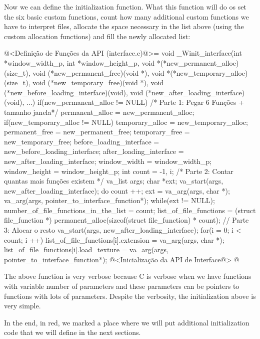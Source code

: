 Now we can define the initialization function. What this function will
do os set the six basic custom functions, count how many additional
custom functions we have to interpret files, allocate the space
necessary in the list above (using the custom allocation functions)
and fill the newly allocated list:

\iniciocodigo
@<Definição de Funções da API (interface.c)@>=
void _Winit_interface(int *window_width_p, int *window_height_p,
                      void *(*new_permanent_alloc)(size_t),
                      void (*new_permanent_free)(void *),
                      void *(*new_temporary_alloc)(size_t),
                      void (*new_temporary_free)(void *),
                      void (*new_before_loading_interface)(void),
                      void (*new_after_loading_interface)(void), ...){
  if(new_permanent_alloc != NULL) /* Parte 1: Pegar 6 Funções + tamanho janela*/
    permanent_alloc = new_permanent_alloc;
  if(new_temporary_alloc != NULL)
    temporary_alloc = new_temporary_alloc;
  permanent_free = new_permanent_free;
  temporary_free = new_temporary_free;
  before_loading_interface = new_before_loading_interface;
  after_loading_interface = new_after_loading_interface;
  window_width = window_width_p;
  window_height = window_height_p;
  {
    int count = -1, i; /* Parte 2: Contar quantas mais funções existem */
    va_list args;
    char *ext;
    va_start(args, new_after_loading_interface);
    do{
      count ++;
      ext = va_arg(args, char *);
      va_arg(args, pointer_to_interface_function*);
    } while(ext != NULL);
    number_of_file_functions_in_the_list = count;
    list_of_file_functions = (struct file_function *)
                               permanent_alloc(sizeof(struct file_function) * 
                                               count); // Parte 3: Alocar o resto
    va_start(args, new_after_loading_interface);
    for(i = 0; i < count; i ++){
      list_of_file_functions[i].extension = va_arg(args, char *);
      list_of_file_functions[i].load_texture =
                          va_arg(args, pointer_to_interface_function*);
    }
  }
  @<Inicialização da API de Interface@>
}
@
\fimcodigo

The above function is very verbose because C is verbose when we have
functions with variable number of parameters and these parameters can
be pointers to functions with lots of parameters. Despite the
verbosity, the initialization above is very simple.

In the end, in red, we marked a place where we will put additional
initialization code that we will define in the next sections.

